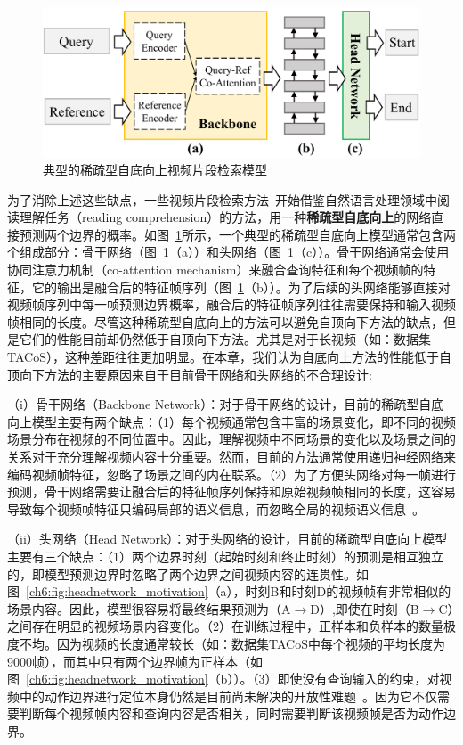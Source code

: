 \begin{figure}[t]
    \centering
    \includegraphics[width=0.8\linewidth]{chapter6/res/sparse_bu.pdf}
    \caption{典型的稀疏型自底向上视频片段检索模型}
    \label{ch6:fig:sparse_bu}
\end{figure}


为了消除上述这些缺点，一些视频片段检索方法~\cite{chen2019localizing,yuan2019find,feng2018video}开始借鉴自然语言处理领域中阅读理解任务（reading comprehension）的方法\cite{xiong2017dynamic,xiong2018dcn+,yu2018qanet}，用一种\textbf{稀疏型自底向上}的网络直接预测两个边界的概率。如图~\ref{ch6:fig:sparse_bu}所示，一个典型的稀疏型自底向上模型通常包含两个组成部分：骨干网络（图~\ref{ch6:fig:sparse_bu}（a））和头网络（图~\ref{ch6:fig:sparse_bu}（c））。骨干网络通常会使用协同注意力机制（co-attention mechanism）来融合查询特征和每个视频帧的特征，它的输出是融合后的特征帧序列（图~\ref{ch6:fig:sparse_bu}（b））。为了后续的头网络能够直接对视频帧序列中每一帧预测边界概率，融合后的特征帧序列往往需要保持和输入视频帧相同的长度。尽管这种稀疏型自底向上的方法可以避免自顶向下方法的缺点，但是它们的性能目前却仍然低于自顶向下方法。尤其是对于长视频（如：数据集TACoS），这种差距往往更加明显。在本章，我们认为自底向上方法的性能低于自顶向下方法的主要原因来自于目前骨干网络和头网络的不合理设计:

（i）骨干网络（Backbone Network）：对于骨干网络的设计，目前的稀疏型自底向上模型主要有两个缺点：（1）每个视频通常包含丰富的场景变化，即不同的视频场景分布在视频的不同位置中。因此，理解视频中不同场景的变化以及场景之间的关系对于充分理解视频内容十分重要。然而，目前的方法通常使用递归神经网络来编码视频帧特征，忽略了场景之间的内在联系。（2）为了方便头网络对每一帧进行预测，骨干网络需要让融合后的特征帧序列保持和原始视频帧相同的长度，这容易导致每个视频帧特征只编码局部的语义信息，而忽略全局的视频语义信息~\cite{chen2018encoder,lin2017feature}。

（ii）头网络（Head Network）：对于头网络的设计，目前的稀疏型自底向上模型主要有三个缺点：（1）两个边界时刻（起始时刻和终止时刻）的预测是相互独立的，即模型预测边界时忽略了两个边界之间视频内容的连贯性。如图~\ref{ch6:fig:headnetwork_motivation}（a），时刻B和时刻D的视频帧有非常相似的场景内容。因此，模型很容易将最终结果预测为（A$\to$D）,即使在时刻（B$\to$C）之间存在明显的视频场景内容变化。（2）在训练过程中，正样本和负样本的数量极度不均。因为视频的长度通常较长（如：数据集TACoS中每个视频的平均长度为9000帧），而其中只有两个边界帧为正样本（如图~\ref{ch6:fig:headnetwork_motivation}（b））。（3）即使没有查询输入的约束，对视频中的动作边界进行定位本身仍然是目前尚未解决的开放性难题~\cite{shou2018online}。因为它不仅需要判断每个视频帧内容和查询内容是否相关，同时需要判断该视频帧是否为动作边界。

